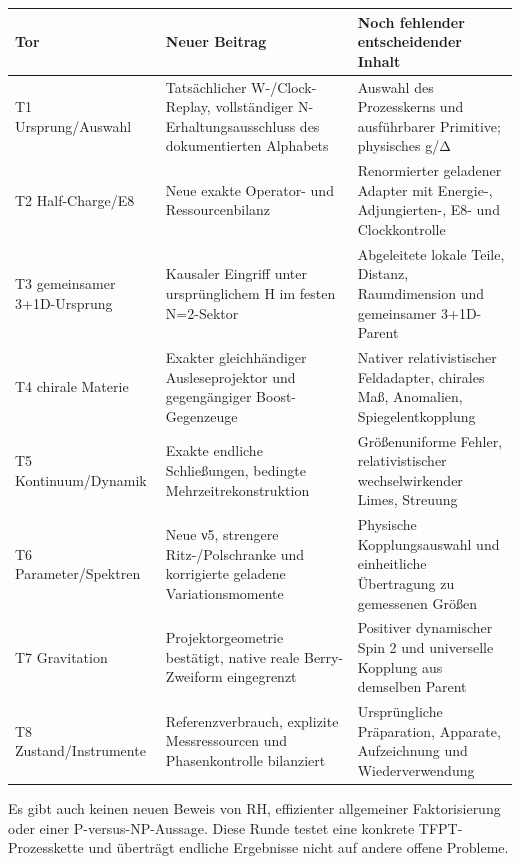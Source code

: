 {\def\LTcaptype{none} %
\begin{longtable}[]{@{}
  >{\raggedright\arraybackslash}p{}
  >{\raggedright\arraybackslash}p{}
  >{\raggedright\arraybackslash}p{}@{}}
\toprule\noalign{}
\begin{minipage}[b]{\linewidth}\raggedright
Tor
\end{minipage} & \begin{minipage}[b]{\linewidth}\raggedright
Neuer Beitrag
\end{minipage} & \begin{minipage}[b]{\linewidth}\raggedright
Noch fehlender entscheidender Inhalt
\end{minipage} \\
\midrule\noalign{}
\endhead
\bottomrule\noalign{}
\endlastfoot
T1 Ursprung/Auswahl & Tatsächlicher W-/Clock-Replay, vollständiger
N-Erhaltungsausschluss des dokumentierten Alphabets & Auswahl des
Prozesskerns und ausführbarer Primitive; physisches g/Δ \\
T2 Half-Charge/E8 & Neue exakte Operator- und Ressourcenbilanz &
Renormierter geladener Adapter mit Energie-, Adjungierten-, E8- und
Clockkontrolle \\
T3 gemeinsamer 3+1D-Ursprung & Kausaler Eingriff unter ursprünglichem H
im festen N=2-Sektor & Abgeleitete lokale Teile, Distanz, Raumdimension
und gemeinsamer 3+1D-Parent \\
T4 chirale Materie & Exakter gleichhändiger Ausleseprojektor und
gegengängiger Boost-Gegenzeuge & Nativer relativistischer Feldadapter,
chirales Maß, Anomalien, Spiegelentkopplung \\
T5 Kontinuum/Dynamik & Exakte endliche Schließungen, bedingte
Mehrzeitrekonstruktion & Größenuniforme Fehler, relativistischer
wechselwirkender Limes, Streuung \\
T6 Parameter/Spektren & Neue ν5, strengere Ritz-/Polschranke und
korrigierte geladene Variationsmomente & Physische Kopplungsauswahl und
einheitliche Übertragung zu gemessenen Größen \\
T7 Gravitation & Projektorgeometrie bestätigt, native reale
Berry-Zweiform eingegrenzt & Positiver dynamischer Spin 2 und
universelle Kopplung aus demselben Parent \\
T8 Zustand/Instrumente & Referenzverbrauch, explizite Messressourcen und
Phasenkontrolle bilanziert & Ursprüngliche Präparation, Apparate,
Aufzeichnung und Wiederverwendung \\
\end{longtable}
}

Es gibt auch keinen neuen Beweis von RH, effizienter allgemeiner
Faktorisierung oder einer P-versus-NP-Aussage. Diese Runde testet eine
konkrete TFPT-Prozesskette und überträgt endliche Ergebnisse nicht auf
andere offene Probleme.

